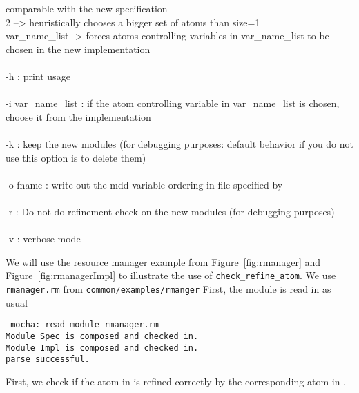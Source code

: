 {     comparable with the new specification \\
     2 --> heuristically chooses a bigger set of atoms than size=1 \\
     var\_name\_list -> forces atoms controlling variables in var\_name\_list to
     be chosen in the new implementation \\
\\
-h  :  print usage \\
\\
-i var\_name\_list : 
     if the atom controlling variable in var\_name\_list is chosen, choose it
     from the implementation \\
\\
-k : keep the new modules (for debugging purposes: default behavior if you
     do not use this option is to delete them) \\
\\
-o fname :
     write out the mdd variable ordering in file specified by \\
\\
-r : 
     Do not do refinement check on the new modules (for debugging
     purposes) \\
\\
-v :
     verbose mode \\
}



\mypar
\noindent
We will use the resource manager example from Figure~\ref{fig:rmanager}
and Figure~\ref{fig:rmanagerImpl}
to illustrate the use of {\tt check\_refine\_atom}.
We use {\tt rmanager.rm} from  {\tt common/examples/rmanger}
First, the module is read in as usual

\mypar
\noindent
{\tt 
mocha: read\_module rmanager.rm \\
Module Spec is composed and checked in. \\
Module Impl is composed and checked in. \\
parse successful. \\
}

\mypar
\noindent
First, we check if the \ALLOC atom in \Rmanager is
refined correctly by the corresponding atom in \RmanagerImpl.

